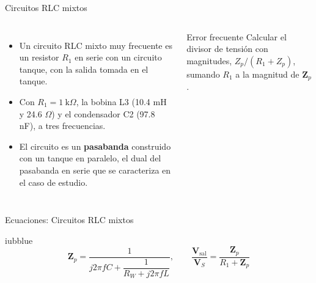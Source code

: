 \documentclass[aspectratio=169,11pt,xcolor={table}]{beamer}
\begin{document}
\begin{frame}{Circuitos RLC mixtos}
\begin{columns}[c,onlytextwidth]
\small
\begin{itemize}\setlength{\itemsep}{4pt}
  \item Un circuito RLC mixto muy frecuente es un resistor $R_1$ en serie con un circuito tanque, con la salida tomada en el tanque.
  \item Con $R_1 = 1\ \text{k}\Omega$, la bobina L3 (10.4 mH y 24.6 \ensuremath{\Omega}) y el condensador C2 (97.8 nF), a tres frecuencias.
  \item El circuito es un \textbf{pasabanda} construido con un tanque en paralelo, el dual del pasabanda en serie que se caracteriza en el caso de estudio.
\end{itemize}
\begin{cardO}{Error frecuente}
\footnotesize Calcular el divisor de tensión con magnitudes, $Z_p/(R_1 + Z_p)$, sumando $R_1$ a la magnitud de $\mathbf{Z}_p$.
\end{cardO}
\end{columns}
\end{frame}

\begin{frame}{Ecuaciones: Circuitos RLC mixtos}
\begin{cajaplana}{iubblue}
\centering
{\large
\begin{equation*}
  \mathbf{Z}_p = \frac{1}{j2\pi f C + \dfrac{1}{R_W + j2\pi f L}}, \qquad \frac{\mathbf{V}_{\mathrm{sal}}}{\mathbf{V}_S} = \frac{\mathbf{Z}_p}{R_1 + \mathbf{Z}_p}
\end{equation*}
}
\end{cajaplana}
\end{frame}
\end{document}
